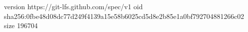 version https://git-lfs.github.com/spec/v1
oid sha256:0fbe48d08dc77d249f4139a15e58b6025cd5d8e2b85e1a0bf792704881266c02
size 196704
